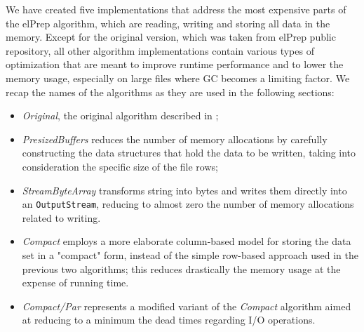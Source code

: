 \documentclass[a4paper,twoside]{article}
\begin{document}
We have created five implementations that address the most expensive parts of the elPrep algorithm, which are reading,  writing and storing all data in the memory. 
Except for the original version, which was taken from elPrep public repository, all other algorithm implementations contain various types of optimization that are meant to improve runtime performance and to lower the memory usage, especially on large files where GC becomes a limiting factor. 
We recap the names of the algorithms as they are used in the following sections:
\begin{itemize}
\item {\it Original}, the original algorithm described in \cite{costanza:2019};

\item {\it PresizedBuffers} reduces the number of memory allocations by carefully constructing the data structures that hold the data to be written, taking into consideration the specific size of the file rows;

\item {\it StreamByteArray} transforms string into bytes and writes them directly into an \texttt{OutputStream}, reducing to almost zero the number of memory allocations related to writing.

\item {\it Compact} employs a more elaborate column-based model for storing the data set in a "compact" form, instead of the simple row-based approach used in the previous two algorithms; this reduces drastically the memory usage at the expense of running time.

\item {\it Compact/Par} represents a modified variant of the {\it Compact} algorithm aimed at reducing to a minimum the dead times regarding I/O operations.

\end{itemize}
\end{document}
